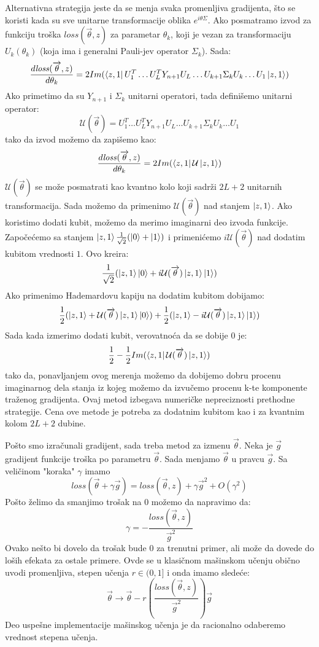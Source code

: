 \documentclass[12pt, letterpaper, oneside]{article}
\begin{document}
Alternativna strategija jeste da se menja svaka promenljiva gradijenta, što se koristi kada su sve unitarne transformacije oblika $e^{i\theta\Sigma}$.
Ako posmatramo izvod za funkciju troška $\mathit{loss}(\overrightarrow{\theta},z)$ za parametar $\theta_k$, koji je vezan za transformaciju $U_k(\theta_k)$
(koja ima i generalni Pauli-jev operator $\Sigma_k$). Sada:
\[
    \frac{d\mathit{loss}(\overrightarrow{\theta},z)}{d\theta_k} = 2Im(\Bra{z,1}U_1^T \dots U_L^TY_{n+1}U_L \dots U_{k+1} \Sigma_k U_k \dots U_1 \Ket{z,1})
\]
Ako primetimo da su $Y_{n+1}$ i $\Sigma_k$ unitarni operatori, tada definišemo unitarni operator:
\[
    \mathcal{U}(\overrightarrow{\theta}) = U_1^T \dots U_L^TY_{n+1}U_L \dots U_{k+1} \Sigma_k U_k \dots U_1
\]
tako da izvod možemo da zapišemo kao:
\[
    \frac{d\mathit{loss}(\overrightarrow{\theta},z)}{d\theta_k} = 2Im(\Bra{z,1}\mathcal{U}\Ket{z,1})
\]
$\mathcal{U}(\overrightarrow{\theta})$ se može posmatrati kao kvantno kolo koji sadrži $2L+2$ unitarnih transformacija.
Sada možemo da primenimo $\mathcal{U}(\overrightarrow{\theta})$ nad stanjem $\Ket{z,1}$. Ako koristimo dodati kubit, možemo da merimo imaginarni deo
izvoda funkcije. Započećemo sa stanjem $\Ket{z,1}\frac{1}{\sqrt{2}}(\Ket{0}+\Ket{1})$ i primenićemo $i\mathcal{U}(\overrightarrow{\theta})$ nad dodatim kubitom vrednosti $1$.
Ovo kreira:
\[
    \frac{1}{\sqrt{2}}(\Ket{z,1}\Ket{0} + i\mathcal{U}(\overrightarrow{\theta})\Ket{z,1}\Ket{1})
\]
Ako primenimo Hademardovu kapiju na dodatim kubitom dobijamo:
\[
    \frac{1}{2}(\Ket{z,1}+\mathcal{U}(\overrightarrow{\theta})\Ket{z,1}\Ket{0}) + \frac{1}{2}(\Ket{z,1}-i\mathcal{U}(\overrightarrow{\theta})\Ket{z,1}\Ket{1})
\]
Sada kada izmerimo dodati kubit, verovatnoća da se dobije $0$ je:
\[
    \frac{1}{2} - \frac{1}{2}Im(\bra{z,1}\mathcal{U}(\overrightarrow{\theta})\Ket{z,1})
\]
tako da, ponavljanjem ovog merenja možemo da dobijemo dobru procenu imaginarnog dela stanja iz kojeg možemo da izvučemo procenu k-te komponente traženog gradijenta.
Ovaj metod izbegava numeričke nepreciznosti prethodne strategije. Cena ove metode je potreba za dodatnim kubitom kao i za kvantnim kolom $2L+2$ dubine.

Pošto smo izračunali gradijent, sada treba metod za izmenu $\overrightarrow{\theta}$. Neka je $\overrightarrow{g}$ gradijent funkcije troška po parametru $\overrightarrow{\theta}$.
Sada menjamo $\overrightarrow{\theta}$ u pravcu $\overrightarrow{g}$. Sa veličinom "koraka" $\gamma$ imamo
\[
    \mathit{loss}(\overrightarrow{\theta}+\gamma \overrightarrow{g}) = \mathit{loss}(\overrightarrow{\theta},z)+ \gamma \overrightarrow{g}^2 + O(\gamma^2)
\]
Pošto želimo da smanjimo trošak na $0$ možemo da napravimo da:
\[
    \gamma = -\frac{\mathit{loss}(\overrightarrow{\theta},z)}{\overrightarrow{g}^2}
\]
Ovako nešto bi dovelo da trošak bude $0$ za trenutni primer, ali može da dovede do loših efekata za ostale primere.
Ovde se u klasičnom mašinskom učenju obično uvodi promenljiva, stepen učenja $r \in (0,1]$ i onda imamo sledeće:
\[
    \overrightarrow{\theta} \to \overrightarrow{\theta} - r(\frac{\mathit{loss}(\overrightarrow{\theta},z)}{\overrightarrow{g}^2})\overrightarrow{g}
\]
Deo uspešne implementacije mašinskog učenja je da racionalno odaberemo vrednost stepena učenja.
\end{document}
